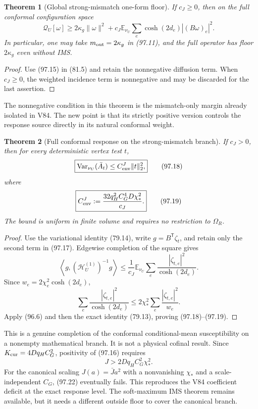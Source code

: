 \documentclass[11pt]{article}
\newtheorem{theorem}{Theorem}[section]
\theoremstyle{remark}
\begin{document}
\begin{theorem}[Global strong-mismatch one-form floor]
\label{thm:v17v97-strong-floor}
If \(c_J\geq0\), then on the full conformal configuration space
\[
 \mathcal Q_U[\omega]
 \geq2\kappa_g\|\omega\|^2
 +c_J\mathbb E_{\nu_U}
   \sum_e\cosh(2d_e)|(B\omega)_e|^2.                \tag{97.17}
\]
In particular, one may take \(m_{\rm out}=2\kappa_g\) in (97.11),
and the full operator has floor \(2\kappa_g\) even without IMS.
\end{theorem}

\begin{proof}
Use (97.15) in (81.5) and retain the nonnegative diffusion term.
When \(c_J\geq0\), the weighted incidence term is nonnegative and may
be discarded for the last assertion.
\end{proof}

The nonnegative condition in this theorem is the mismatch-only margin
already isolated in V84.  The new point is that its strictly positive
version controls the response source directly in its natural
conformal weight.

\begin{theorem}[Full conformal response on the strong-mismatch branch]
\label{thm:v17v97-full-response}
If \(c_J>0\), then for every deterministic vertex test \(t\),
\[
\boxed{
 \operatorname{Var}_{\nu_U}(\bar A_t)
 \leq C_{\rm env}^{J}\|t\|_2^2,}                   \tag{97.18}
\]
where
\[
\boxed{
 C_{\rm env}^{J}
 :=\frac{32q_H^2C_G^4D\chi_*^2}{c_J}.}              \tag{97.19}
\]
The bound is uniform in finite volume and requires no restriction to
\(\Omega_R\).
\end{theorem}

\begin{proof}
Use the variational identity (79.14), write
\(g=B^{\mathsf T}\zeta_t\), and retain only the second term in
(97.17).  Edgewise completion of the square gives
\[
 \left\langle g,(\mathscr H_U^{(1)})^{-1}g\right\rangle
 \leq\frac1{c_J}\mathbb E_{\nu_U}
       \sum_e\frac{|\zeta_{t,e}|^2}{\cosh(2d_e)}.   \tag{97.20}
\]
Since \(w_e=2\chi_e^2\cosh(2d_e)\),
\[
 \sum_e\frac{|\zeta_{t,e}|^2}{\cosh(2d_e)}
 \leq2\chi_*^2\sum_e\frac{|\zeta_{t,e}|^2}{w_e}.  \tag{97.21}
\]
Apply (96.6) and then the exact identity (79.13), proving
(97.18)--(97.19).
\end{proof}

This is a genuine completion of the conformal conditional-mean
susceptibility on a nonempty mathematical branch.  It is not a
physical cofinal result.  Since
\(K_{\rm cur}=4Dq_HC_G^2\), positivity of (97.16) requires
\[
 J>2Dq_HC_G^2\chi_*^2.                              \tag{97.22}
\]
For the canonical scaling \(J(a)=\bar J a^2\) with a nonvanishing
\(\chi_*\) and a scale-independent \(C_G\), (97.22) eventually fails.
This reproduces the V84 coefficient deficit at the exact response
level.  The soft-maximum IMS theorem remains available, but it needs a
different outside floor to cover the canonical branch.
\end{document}
